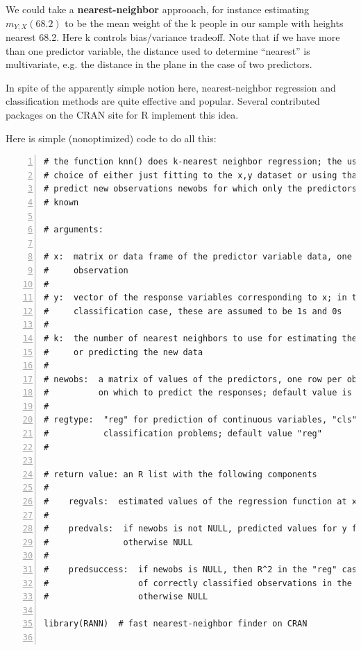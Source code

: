 We could take a {\bf nearest-neighbor} approoach, for instance
estimating $m_{Y;X}(68.2)$ to be the mean weight of the k people in our
sample with heights nearest 68.2.  Here k controls bias/variance
tradeoff.  Note that if we have more than one predictor variable, the
distance used to determine ``nearest'' is multivariate, e.g. the
distance in the plane in the case of two predictors.

In spite of the apparently simple notion here, nearest-neighbor
regression and classification methods are quite effective and popular.
Several contributed packages on the CRAN site for R implement this idea.

Here is simple (nonoptimized) code to do all this:

\begin{lstlisting}[numbers=left]
# the function knn() does k-nearest neighbor regression; the user has a
# choice of either just fitting to the x,y dataset or using that data to
# predict new observations newobs for which only the predictors are
# known

# arguments:

# x:  matrix or data frame of the predictor variable data, one row per
#     observation
#
# y:  vector of the response variables corresponding to x; in the
#     classification case, these are assumed to be 1s and 0s
#
# k:  the number of nearest neighbors to use for estimating the regression
#     or predicting the new data
#
# newobs:  a matrix of values of the predictors, one row per observation,
#          on which to predict the responses; default value is NULL
#
# regtype:  "reg" for prediction of continuous variables, "cls" for
#           classification problems; default value "reg"
#

# return value: an R list with the following components
#
#    regvals:  estimated values of the regression function at x
#
#    predvals:  if newobs is not NULL, predicted values for y from newobs
#               otherwise NULL
#
#    predsuccess:  if newobs is NULL, then R^2 in the "reg" case, proportion 
#                  of correctly classified observations in the "cls" case; 
#                  otherwise NULL

library(RANN)  # fast nearest-neighbor finder on CRAN


\end{lstlisting}
